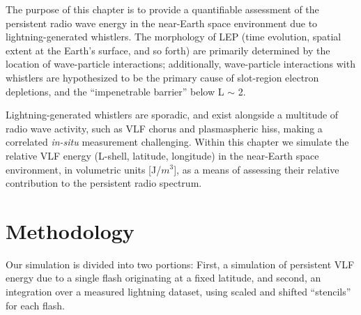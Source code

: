 The purpose of this chapter is to provide a quantifiable assessment of the persistent radio wave energy in the near-Earth space environment due to lightning-generated whistlers. The morphology of LEP (time evolution, spatial extent at the Earth's surface, and so forth) are primarily determined by the location of wave-particle interactions; additionally, wave-particle interactions with whistlers are hypothesized to be the primary cause of slot-region electron depletions, and the ``impenetrable barrier'' below L $\sim$ 2.

Lightning-generated whistlers are sporadic, and exist alongside a multitude of radio wave activity, such as VLF chorus and plasmaspheric hiss, making a correlated \emph{in-situ} measurement challenging. Within this chapter we simulate the relative VLF energy (L-shell, latitude, longitude) in the near-Earth space environment, in volumetric units [J/$m^3$], as a means of assessing their relative contribution to the persistent radio spectrum.


\section{Methodology}
Our simulation is divided into two portions: First, a simulation of persistent VLF energy due to a single flash originating at a fixed latitude, and second, an integration over a measured lightning dataset, using scaled and shifted ``stencils'' for each flash.

